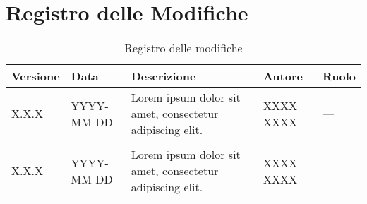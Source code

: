 \section*{Registro delle Modifiche}
\begin{table}[ht!]	
		\centering
		\begin{tabular}{p{1.2cm} p{2cm} p{6cm} p{3cm} p{2cm}}
			\toprule
			\textbf{Versione}& \textbf{Data} & \textbf{Descrizione} & \textbf{Autore} & \textbf{Ruolo} \\
			\midrule
			X.X.X & YYYY-MM-DD & Lorem ipsum dolor sit amet, consectetur adipiscing elit.  & XXXX XXXX &
			--- \\\\ %
			X.X.X & YYYY-MM-DD & Lorem ipsum dolor sit amet, consectetur adipiscing elit.  & XXXX XXXX & --- \\
			\bottomrule
		\end{tabular}
		\caption{Registro delle modifiche}
		\label{table:Registro delle modifiche}
\end{table}

